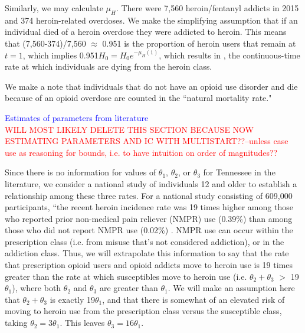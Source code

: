 \documentclass[12pt]{article}
\begin{document}
Similarly, we may calculate $\mu_{H}$. There were 7,560 heroin/fentanyl addicts in 2015 and 374 heroin-related overdoses. We make the simplifying assumption that if an individual died of a heroin overdose they were addicted to heroin. This means that (7,560-374)/7,560 $\approx$ 0.951 is the proportion of heroin users that remain at $t=1$, which implies 0.951$H_0=H_0 e^{-\mu_{H}(1)}$, which results in  \unboldmath, the continuous-time rate at which individuals are dying from the heroin class.


We make a note that individuals that do not have an opioid use disorder and die because of an opioid overdose are counted in the ``natural mortality rate." 

\pagebreak

\textcolor{blue}{Estimates of parameters from literature} \\
\textcolor{red}{WILL MOST LIKELY DELETE THIS SECTION BECAUSE NOW ESTIMATING PARAMETERS AND IC WITH MULTISTART??--unless case use as reasoning for bounds, i.e. to have intuition on order of magnitudes??} 

Since there is no information for values of $\theta_1$, $\theta_2$, or $\theta_3$ for Tennessee in the literature, we consider a national study of individuals 12 and older to establish a relationship among these three rates. For a national study consisting of 609,000 participants, ``the recent heroin incidence rate was 19 times higher among those who reported prior non-medical pain reliever (NMPR) use (0.39\%) than among those who did not report NMPR use (0.02\%) \cite{Muhuri}.
NMPR use can occur within the prescription class (i.e. from misuse that's not considered addiction), or in the addiction class. Thus, we will extrapolate this information to say that the rate that prescription opioid users and opioid addicts move to heroin use is 19 times greater than the rate at which susceptibles move to heroin use (i.e. $\theta_2 + \theta_3$ $>$ 19$\theta_1$), where both $\theta_2$ and $\theta_3$ are greater than $\theta_1.$ We will make an assumption here that $\theta_2 + \theta_3$ is exactly 19$\theta_1$, and that there is somewhat of an elevated risk of moving to heroin use from the prescription class versus the susceptible class, taking $\theta_2 =3 \theta_1$. This leaves $\theta_3=16\theta_1.$ \\
\end{document}
